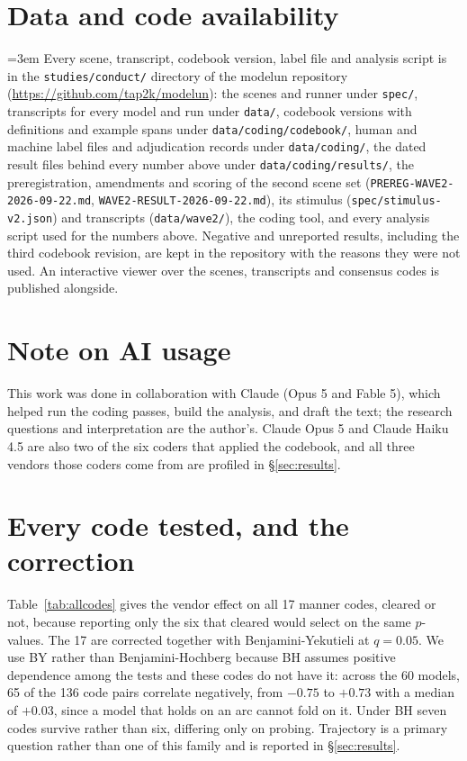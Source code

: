\documentclass[11pt]{article}
\begin{document}
\section*{Data and code availability}
\begingroup\sloppy\emergencystretch=3em
Every scene, transcript, codebook version, label file and analysis script is in the
\texttt{studies/conduct/} directory of the modelun repository
(\url{https://github.com/tap2k/modelun}): the scenes and runner under \texttt{spec/}, transcripts
for every model and run under \texttt{data/}, codebook versions with definitions and example spans
under \texttt{data/coding/codebook/}, human and machine label files and adjudication records under
\texttt{data/coding/}, the dated result files behind every number above under
\texttt{data/coding/results/}, the preregistration, amendments and scoring of the second scene set
(\texttt{PREREG-WAVE2-2026-09-22.md}, \texttt{WAVE2-RESULT-2026-09-22.md}), its stimulus
(\texttt{spec/stimulus-v2.json}) and transcripts (\texttt{data/wave2/}),
the coding tool, and every analysis script used for the numbers above.
Negative and unreported results, including the third codebook revision, are kept in the repository
with the reasons they were not used. An interactive viewer over the scenes, transcripts and
consensus codes is published alongside.
\par\endgroup

\section*{Note on AI usage}
This work was done in collaboration with Claude (Opus 5 and Fable 5), which helped run the coding passes, build
the analysis, and draft the text; the research questions and interpretation are the author's. Claude
Opus 5 and Claude Haiku 4.5 are also two of the six coders that applied the codebook, and all three
vendors those coders come from are profiled in \S\ref{sec:results}.





\clearpage
\appendix

\section{Every code tested, and the correction}
\label{app:codes}

Table~\ref{tab:allcodes} gives the vendor effect on all 17 manner codes, cleared or not, because
reporting only the six that cleared would select on the same $p$-values. The 17 are corrected
together with Benjamini-Yekutieli at $q=0.05$. We use BY rather than Benjamini-Hochberg because BH
assumes positive dependence among the tests and these codes do not have it: across the 60 models,
65 of the 136 code pairs correlate negatively, from $-0.75$ to $+0.73$ with a median of $+0.03$,
since a model that holds on an arc cannot fold on it. Under BH seven codes survive rather than six,
differing only on probing. Trajectory is a primary question rather than one of this family and is
reported in \S\ref{sec:results}.
\end{document}
